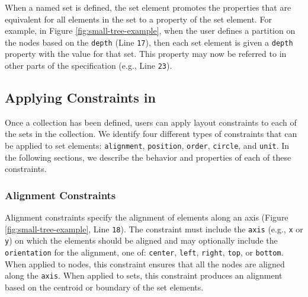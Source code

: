 
When a named set is defined, the set element promotes the properties that are equivalent for all elements in the set to a property of the set element. For example, in Figure \ref{fig:small-tree-example}, when the user defines a partition on the nodes based on the \texttt{depth} (Line \texttt{17}), then each set element is given a \texttt{depth} property with the value for that set. This property may now be referred to in other parts of the \projectname specification (e.g., Line \texttt{23}).


\subsection{Applying Constraints in \projectname}
\label{sec:constraints}
Once a collection has been defined, users can apply layout constraints to each of the sets in the collection. We identify four different types of constraints that can be applied to set elements: \texttt{alignment}, \texttt{position}, \texttt{order}, \texttt{circle}, and \texttt{unit}. In the following sections, we describe the behavior and properties of each of these constraints.


\subsubsection{Alignment Constraints}
Alignment constraints specify the alignment of elements along an axis (Figure \ref{fig:small-tree-example}, Line \texttt{18}). The constraint must include the \texttt{axis} (e.g., \texttt{x} or \texttt{y}) on which the elements should be aligned and may optionally include the \texttt{orientation} for the alignment, one of: \texttt{center}, \texttt{left}, \texttt{right}, \texttt{top}, or \texttt{bottom}. When applied to nodes, this constraint ensures that all the nodes are aligned along the \texttt{axis}. When applied to sets, this constraint produces an alignment based on the centroid or boundary of the set elements.

